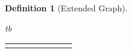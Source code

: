 \documentclass[10pt, conference, letterpaper]{IEEEtran}
\newtheorem{definition}[theorem]{Definition}
\begin{document}
\begin{definition}[Extended Graph]
{\begin{IPFormulation}{tb}
{\begin{tabular}{FFCLLBB}
\begin{comment}
From an algorithmic perspective, 
the service chain embedding problem
can be seen as a variant of 
graph embedding problems studied
in the context of VPNs~\cite{Fingerhut,vpn-true,Gupta-VPN},
parallel architectures~\cite{faulty-emulation-leighton,parallel-arch-Leighton},
and especially VLSI layout problems~\cite{diaz2002survey,vlsi-layout},
which also exhibit flexibilities for the endpoint placement,
and which has been studied for various objective functions,
from cutwidth~\cite{cutwidth-1,cutwidth-2},
over sum cuts~\cite{minsumcut}, profiles~\cite{profile} 
to minimal linear arrangements~\cite{harper}.
Oversimplifying, embedding problems can be categorized
into to classes: load minimization and sum / footprint minimization problems.
While the former has received more attention in the literature,
our model can be seen as an instance of the latter,
and in some sense, the Minimal Linear Arrangement~(MLA)~is the archetypical
embedding footprint minimization problem,
where the substrate network has a most simple topology:
a linear chain.
Garey, Johnson, and Stockmeyer were the first to prove
its NP-hardness on general graphs~\cite{mla-np-hard}.
Amb\"uhl, Mastrolilli, and Svensson showed that the MLA
on general graphs does not have a polynomial time
approximation scheme unless NP-complete problems
can be solved in randomized subexponential time~\cite{mla-ptas}.
A major result in the area is due to Leighton et al.~\cite{vlsi-leighton-maxminflow},
who generalized
the classic 1-commodity max-flow min-cut theorem for problems with
multiple commodities. The result has interesting applications to the field of approximation
algorithmsm, and the authors showed polynomial time~(polylog
n-times-optimal)~approximation algorithms for many 
NP-hard optimization problems, such as
graph partitioning, min-cut linear arrangement, crossing number, VLSI layout~\cite{vlsi-layout,Yeh-circuit}, and minimum
feedback arc set.
MLA can be~ approximated in
polynomial time, as shown by
 to Charikar, Hajiaghayi,
Karloff, and Rao~\cite{best-mla-1}, and by Feige and Lee~\cite{mla-best-2}.
The latter algorithm is a combination of techniques of earlier works by
Rao and Richa~\cite{rao04new-approximation}, and Arora, Rao, and Vazirani~\cite{arora-jacm}.
However, while several approximation algorithms are known
for VLSI layout problems~\cite{diaz2002survey,vlsi-layout},
they cannot be adopted for embedding service chains in 
general substrate graphs.
\end{comment}


\end{tabular}}
\end{IPFormulation}}
\end{definition}
\end{document}
